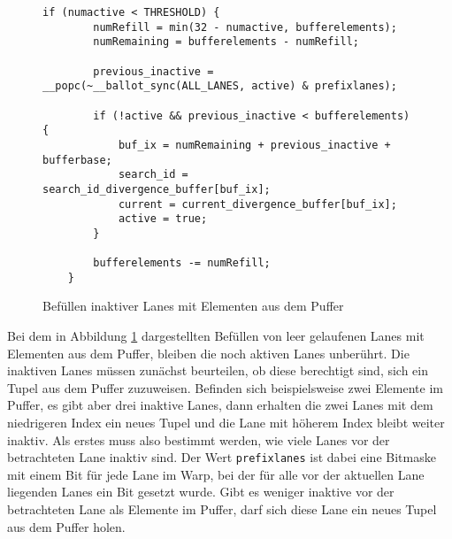 \begin{figure}[ht]
	\begin{lstlisting}[language=MyC++]
	if (numactive < THRESHOLD) {
		numRefill = min(32 - numactive, bufferelements);
		numRemaining = bufferelements - numRefill;
		
		previous_inactive = __popc(~__ballot_sync(ALL_LANES, active) & prefixlanes);
		
		if (!active && previous_inactive < bufferelements) {
			buf_ix = numRemaining + previous_inactive + bufferbase;
			search_id = search_id_divergence_buffer[buf_ix];
			current = current_divergence_buffer[buf_ix];
			active = true;
		}
		
		bufferelements -= numRefill;
	}
	\end{lstlisting}
	\caption{Befüllen inaktiver Lanes mit Elementen aus dem Puffer}
	\label{refill_code}
\end{figure}

Bei dem in Abbildung \ref{refill_code} dargestellten Befüllen von leer gelaufenen Lanes mit Elementen aus dem Puffer, bleiben die noch aktiven Lanes unberührt.
Die inaktiven Lanes müssen zunächst beurteilen, ob diese berechtigt sind, sich ein Tupel aus dem Puffer zuzuweisen.
Befinden sich beispielsweise zwei Elemente im Puffer, es gibt aber drei inaktive Lanes, dann erhalten die zwei Lanes mit dem niedrigeren Index ein neues Tupel und die Lane mit höherem Index bleibt weiter inaktiv.
Als erstes muss also bestimmt werden, wie viele Lanes vor der betrachteten Lane inaktiv sind.
Der Wert \texttt{prefixlanes} ist dabei eine Bitmaske mit einem Bit für jede Lane im Warp, bei der für alle vor der aktuellen Lane liegenden Lanes ein Bit gesetzt wurde.
Gibt es weniger inaktive vor der betrachteten Lane als Elemente im Puffer, darf sich diese Lane ein neues Tupel aus dem Puffer holen.

